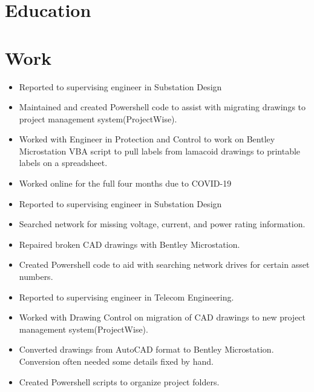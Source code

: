 \documentclass{lsanche_cv}
\begin{document}
\noindent
{}



\begin{multicols*}{2}
  \section{Education}

  \section{Work}
    \begin{itemize}
      \item Reported to supervising engineer in Substation Design
      \item Maintained and created Powershell code to assist with migrating drawings to project management system(ProjectWise).
      \item Worked with Engineer in Protection and Control to work on Bentley Microstation VBA script to pull labels from lamacoid drawings to printable labels on a spreadsheet.
      \item Worked online for the full four months due to COVID-19
    \end{itemize}

    \begin{itemize}
      \item Reported to supervising engineer in Substation Design
      \item Searched network for missing voltage, current, and power rating information.
      \item Repaired broken CAD drawings with Bentley Microstation.
      \item Created Powershell code to aid with searching network drives for certain asset numbers.
    \end{itemize}

    \begin{itemize}
      \item Reported to supervising engineer in Telecom Engineering.
      \item Worked with Drawing Control on migration of CAD drawings to new project management system(ProjectWise).
      \item Converted drawings from AutoCAD format to Bentley Microstation. Conversion often needed some details fixed by hand.
      \item Created Powershell scripts to organize project folders.
    \end{itemize}


\end{multicols*}
\end{document}
